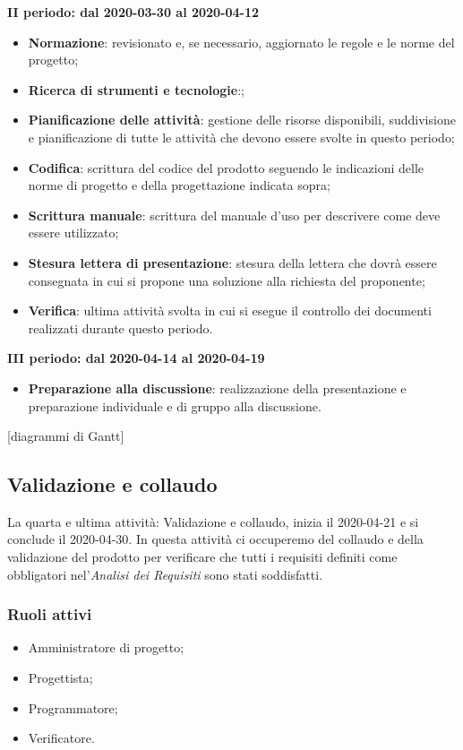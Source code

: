 \textbf{II periodo: dal 2020-03-30 al 2020-04-12}
\begin{itemize}
	\item \textbf{Normazione}: revisionato e, se necessario, aggiornato le regole e le norme del progetto;
	\item \textbf{Ricerca di strumenti e tecnologie}:;
	\item \textbf{Pianificazione delle attività}: gestione delle risorse disponibili, suddivisione e pianificazione di tutte le attività che devono essere svolte in questo periodo;
	\item \textbf{Codifica}: scrittura del codice del prodotto seguendo le indicazioni delle norme di progetto e della progettazione indicata sopra;
	\item \textbf{Scrittura manuale}: scrittura del manuale d'uso per descrivere come deve essere utilizzato;
	\item \textbf{Stesura lettera di presentazione}: stesura della lettera che dovrà essere consegnata in cui si propone una soluzione alla richiesta del proponente;
	\item \textbf{Verifica}: ultima attività svolta in cui si esegue il controllo dei documenti realizzati durante questo periodo.
\end{itemize}

\textbf{III periodo: dal 2020-04-14 al 2020-04-19}
\begin{itemize}
	\item \textbf{Preparazione alla discussione}: realizzazione della presentazione e preparazione individuale e di gruppo alla discussione.
\end{itemize}

[diagrammi di Gantt]

\subsection{Validazione e collaudo}
La quarta e ultima attività: Validazione e collaudo, inizia il 2020-04-21 e si conclude il 2020-04-30. In questa attività ci occuperemo del collaudo e della validazione del prodotto per verificare che tutti i requisiti definiti come obbligatori nel'\textit{Analisi dei Requisiti} sono stati soddisfatti.

\subsubsection{Ruoli attivi}
\begin{itemize}
	\item Amministratore di progetto;
	\item Progettista;
	\item Programmatore;
	\item Verificatore.
\end{itemize}

